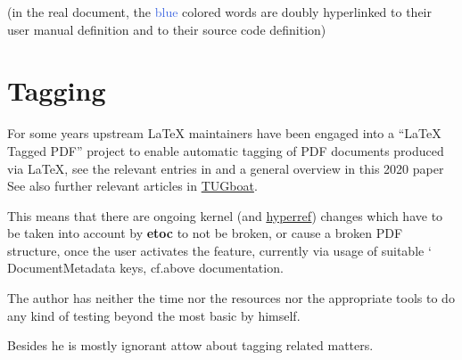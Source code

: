 \documentclass{article}
\DeclareRobustCommand\csa [1]
                {{\ttfamily\hyphenchar\font45 \char`\\ #1}}
\newcommand\etoc{%
        \texorpdfstring{{\color{joli}\ttfamily\bfseries etoc}}{etoc}\xspace}
\DeclareRobustCommand\ctanpkg[1]
      {\texorpdfstring{\href{https://ctan.org/pkg/#1}{#1}}{#1}}
\begin{document}
(in the real document, the \textcolor{RoyalBlue}{blue} colored words are
doubly hyperlinked to their user manual definition and to their source code definition)

\onehalfspacing

\section{Tagging}
\label{etoctaggingon}
\label{etoctaggingoff}
\label{etoctagginginlineoff}

For some years upstream \LaTeX{} maintainers have been engaged into a
``\LaTeX{} Tagged PDF'' project to enable automatic tagging of PDF
documents produced via \LaTeX, see the relevant entries in
and a general overview in this 2020 paper
See also further relevant articles in \href{https://tug.org/tugboat}{TUGboat}.

This means that there are ongoing kernel (and \ctanpkg{hyperref}) changes
which have to be taken into account by \etoc to not be broken, or cause a
broken PDF structure, once the user activates the feature, currently via usage of
suitable \csa{DocumentMetadata} keys, cf.\@ above documentation.

\begingroup{}
\begin{shaded}
The author has neither the time nor the resources nor the appropriate tools to
do any kind of testing beyond the most basic by himself.

Besides he is mostly ignorant attow about tagging related matters.
\end{shaded}
\endgroup
\end{document}
